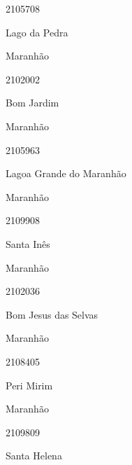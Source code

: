 \documentclass[
  letterpaper,
]{report}
\begin{document}
\n      

2105708

\n      

Lago da Pedra

\n    

\n    

\n      

Maranhão

\n      

2102002

\n      

Bom Jardim

\n    

\n    

\n      

Maranhão

\n      

2105963

\n      

Lagoa Grande do Maranhão

\n    

\n    

\n      

Maranhão

\n      

2109908

\n      

Santa Inês

\n    

\n    

\n      

Maranhão

\n      

2102036

\n      

Bom Jesus das Selvas

\n    

\n    

\n      

Maranhão

\n      

2108405

\n      

Peri Mirim

\n    

\n    

\n      

Maranhão

\n      

2109809

\n      

Santa Helena
\end{document}
